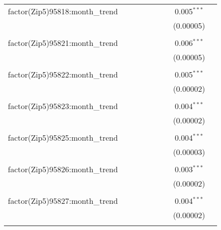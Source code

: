 \begin{table}[H]
{\begin{tabular}{@{\extracolsep{5pt}}lcccccccc}
  factor(Zip5)95818:month\_trend &  &  &  &  &  &  & 0.005$^{***}$ &  \\  

   &  &  &  &  &  &  & (0.00005) &  \\  

   & & & & & & & & \\  

  factor(Zip5)95821:month\_trend &  &  &  &  &  &  & 0.006$^{***}$ &  \\  

   &  &  &  &  &  &  & (0.00005) &  \\  

   & & & & & & & & \\  

  factor(Zip5)95822:month\_trend &  &  &  &  &  &  & 0.005$^{***}$ &  \\  

   &  &  &  &  &  &  & (0.00002) &  \\  

   & & & & & & & & \\  

  factor(Zip5)95823:month\_trend &  &  &  &  &  &  & 0.004$^{***}$ &  \\  

   &  &  &  &  &  &  & (0.00002) &  \\  

   & & & & & & & & \\  

  factor(Zip5)95825:month\_trend &  &  &  &  &  &  & 0.004$^{***}$ &  \\  

   &  &  &  &  &  &  & (0.00003) &  \\  

   & & & & & & & & \\  

  factor(Zip5)95826:month\_trend &  &  &  &  &  &  & 0.003$^{***}$ &  \\  

   &  &  &  &  &  &  & (0.00002) &  \\  

   & & & & & & & & \\  

  factor(Zip5)95827:month\_trend &  &  &  &  &  &  & 0.004$^{***}$ &  \\  

   &  &  &  &  &  &  & (0.00002) &  \\  

   & & & & & & & & \\  


\end{tabular}}
\end{table}
